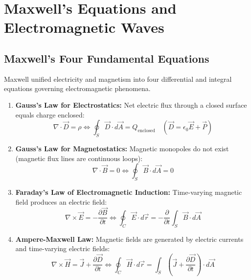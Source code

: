 \documentclass[12pt,a4paper]{article}
\begin{document}
\section{Maxwell's Equations and Electromagnetic Waves}

\subsection{Maxwell's Four Fundamental Equations}

Maxwell unified electricity and magnetism into four differential and integral equations governing electromagnetic phenomena.

\begin{tcolorbox}[formulabox, title={\textbf{Maxwell's Equations in Differential and Integral Forms}}]
\begin{enumerate}[leftmargin=*, itemsep=4pt]
  \item \textbf{Gauss's Law for Electrostatics:} Net electric flux through a closed surface equals charge enclosed:
  \begin{equation}
  \nabla \cdot \vec{D} = \rho \iff \oint_S \vec{D} \cdot d\vec{A} = Q_{\text{enclosed}} \quad (\vec{D} = \epsilon_0 \vec{E} + \vec{P})
  \end{equation}
  \item \textbf{Gauss's Law for Magnetostatics:} Magnetic monopoles do not exist (magnetic flux lines are continuous loops):
  \begin{equation}
  \nabla \cdot \vec{B} = 0 \iff \oint_S \vec{B} \cdot d\vec{A} = 0
  \end{equation}
  \item \textbf{Faraday's Law of Electromagnetic Induction:} Time-varying magnetic field produces an electric field:
  \begin{equation}
  \nabla \times \vec{E} = -\frac{\partial \vec{B}}{\partial t} \iff \oint_C \vec{E} \cdot d\vec{r} = -\frac{\partial}{\partial t}\int_S \vec{B} \cdot d\vec{A}
  \end{equation}
  \item \textbf{Ampere-Maxwell Law:} Magnetic fields are generated by electric currents and time-varying electric fields:
  \begin{equation}
  \nabla \times \vec{H} = \vec{J} + \frac{\partial \vec{D}}{\partial t} \iff \oint_C \vec{H} \cdot d\vec{r} = \int_S \left(\vec{J} + \frac{\partial \vec{D}}{\partial t}\right) \cdot d\vec{A}
  \end{equation}
\end{enumerate}
\end{tcolorbox}
\end{document}
